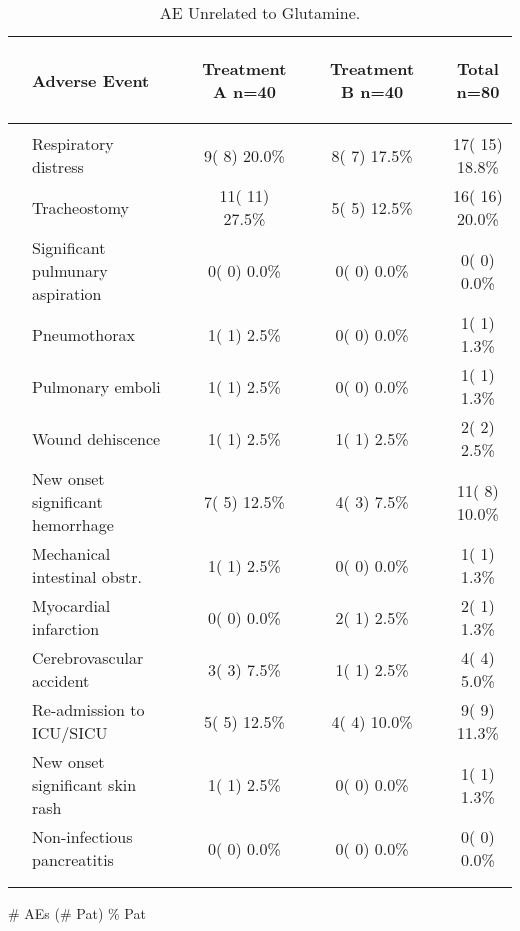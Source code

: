 \documentclass[dvips,10pt]{article}
\begin{document}
\begin{table}[t]
\caption
{ AE Unrelated to Glutamine. }
\begin{center}
\begin{tabular}{ @{}l@{}
@{}l@{}@{}p{1.5em}@{}@{}c@{}@{}p{1.5em}@{}@{}c@{}@{}p{1.5em}@{}@{}c@{}
}
\hline

& \parbox{6em}{\begin{center}Adverse Event\end{center}} && \parbox{6em}{\begin{center}Treatment A n=40\end{center}} && \parbox{6em}{\begin{center}Treatment B n=40\end{center}} && \parbox{6em}{\begin{center}Total n=80\end{center}} \\

\hline

\\
& Respiratory distress && 9(  8) 20.0\% && 8(  7) 17.5\% && 17( 15) 18.8\% \\
& Tracheostomy && 11( 11) 27.5\% && 5(  5) 12.5\% && 16( 16) 20.0\% \\
& Significant pulmunary aspiration && 0(  0)  0.0\% && 0(  0)  0.0\% && 0(  0)  0.0\% \\
& Pneumothorax && 1(  1)  2.5\% && 0(  0)  0.0\% && 1(  1)  1.3\% \\
& Pulmonary emboli && 1(  1)  2.5\% && 0(  0)  0.0\% && 1(  1)  1.3\% \\
& Wound dehiscence && 1(  1)  2.5\% && 1(  1)  2.5\% && 2(  2)  2.5\% \\
& New onset significant hemorrhage && 7(  5) 12.5\% && 4(  3)  7.5\% && 11(  8) 10.0\% \\
& 
Mechanical intestinal obstr. && 1(  1)  2.5\% && 0(  0)  0.0\% && 1(  1)  1.3\% \\
& Myocardial infarction && 0(  0)  0.0\% && 2(  1)  2.5\% && 2(  1)  1.3\% \\
& Cerebrovascular accident && 3(  3)  7.5\% && 1(  1)  2.5\% && 4(  4)  5.0\% \\
& Re-admission to ICU/SICU && 5(  5) 12.5\% && 4(  4) 10.0\% && 9(  9) 11.3\% \\
& New onset significant skin rash && 1(  1)  2.5\% && 0(  0)  0.0\% && 1(  1)  1.3\% \\
& 
Non-infectious pancreatitis && 0(  0)  0.0\% && 0(  0)  0.0\% && 0(  0)  0.0\% \\
\\
\hline \\

\end{tabular}


\parbox{ 5in }{ \# AEs (\# Pat) \% Pat } \\
 \vspace{1em}\end{center}
 \end{table}
\end{document}
